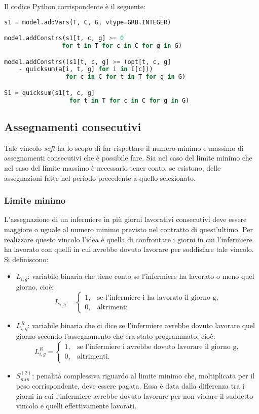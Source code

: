 Il codice Python corrispondente è il seguente:
\begin{lstlisting}[language=Python]
s1 = model.addVars(T, C, G, vtype=GRB.INTEGER)

model.addConstrs(s1[t, c, g] >= 0 
				for t in T for c in C for g in G)

model.addConstrs((s1[t, c, g] >= (opt[t, c, g] 
	- quicksum(a[i, t, g] for i in I[c])) 
   				 for c in C for t in T for g in G)

S1 = quicksum(s1[t, c, g] 
				  for t in T for c in C for g in G)
\end{lstlisting}


\subsection{Assegnamenti consecutivi}
Tale vincolo \textit{soft} ha lo scopo di far rispettare il numero minimo e massimo di assegnamenti consecutivi che è possibile fare. Sia nel caso del limite minimo che nel caso del limite massimo è necessario tener conto, se esistono, delle assegnazioni fatte nel periodo precedente a quello selezionato.

\subsubsection{Limite minimo}
L'assegnazione di un infermiere in più giorni lavorativi consecutivi deve essere maggiore o uguale al numero minimo previsto nel contratto di quest'ultimo. Per realizzare questo vincolo l'idea è quella di confrontare i giorni in cui l'infermiere ha lavorato con quelli in cui avrebbe dovuto lavorare per soddisfare tale vincolo. Si definiscono:
\begin{itemize}
\item $L_{i, g}$: variabile binaria che tiene conto se l'infermiere ha lavorato o meno quel giorno, cioè:
\begin{equation}
\label{eq:varLavorato}
L_{i, g}=
\begin{cases}
1, & \text{se l'infermiere i ha lavorato il giorno g,} \\
0, & \text{altrimenti.}
\end{cases}
\end{equation}
\item $L_{i, g}^R$: variabile binaria che ci dice se l'infermiere avrebbe dovuto lavorare quel giorno secondo l'assegnamento che era stato programmato, cioè:
\begin{equation}
\label{eq:varAvrebbeDovutoLavorare}
L_{i, g}^R=
\begin{cases}
1, & \text{se l'infermiere i avrebbe dovuto lavorare il giorno g,} \\
0, & \text{altrimenti.}
\end{cases}
\end{equation}
\item $S^{(2)}_{min}$: penalità complessiva riguardo al limite minimo che, moltiplicata per il peso corrispondente, deve essere pagata. Essa è data dalla differenza tra i giorni in cui l'infermiere avrebbe dovuto lavorare per non violare il suddetto vincolo e quelli effettivamente lavorati.
\end{itemize}

